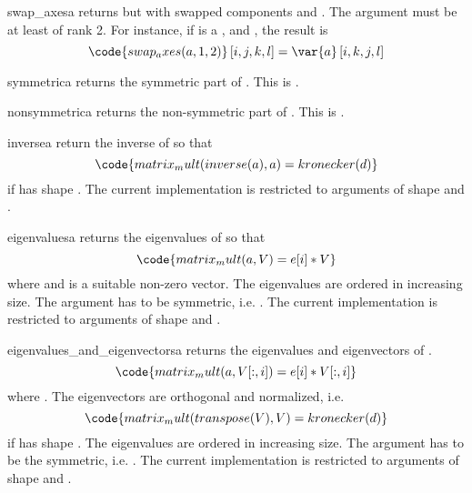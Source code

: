 \begin{funcdesc}{swap_axes}{a}
returns  but with swapped components  and .
The argument  must be at least of rank 2. For instance, if 
is a \RankFour,  and , the result is
\begin{equation}
\code{swap_axes(a,1,2)}\left[i,j,k,l\right]=\var{a} \left[i,k,j,l\right]
\end{equation}
\end{funcdesc}

\begin{funcdesc}{symmetric}{a}
returns the symmetric part of . This is .
\end{funcdesc}

\begin{funcdesc}{nonsymmetric}{a}
returns the non-symmetric part of . This is .
\end{funcdesc}

\begin{funcdesc}{inverse}{a}
return the inverse of  so that
\begin{equation}
\code{matrix_mult(inverse(a),a)=kronecker(d)}
\end{equation}
if  has shape . The current implementation is restricted to
arguments of shape  and .
\end{funcdesc}

\begin{funcdesc}{eigenvalues}{a}
returns the eigenvalues of  so that
\begin{equation}
\code{matrix_mult(a,V)=e[i]*V}
\end{equation}
where  and  is a suitable non-zero vector.
The eigenvalues are ordered in increasing size.
The argument  has to be symmetric, i.e. .
The current implementation is restricted to arguments of shape 
and .
\end{funcdesc}

\begin{funcdesc}{eigenvalues_and_eigenvectors}{a}
returns the eigenvalues and eigenvectors of .
\begin{equation}
\code{matrix_mult(a,V[:,i])=e[i]*V[:,i]}
\end{equation}
where . The eigenvectors  are
orthogonal and normalized, i.e.
\begin{equation}
\code{matrix_mult(transpose(V),V)=kronecker(d)}
\end{equation}
if  has shape . The eigenvalues are ordered in increasing
size. The argument  has to be the symmetric, i.e. .
The current implementation is restricted to arguments of shape 
and .
\end{funcdesc}

